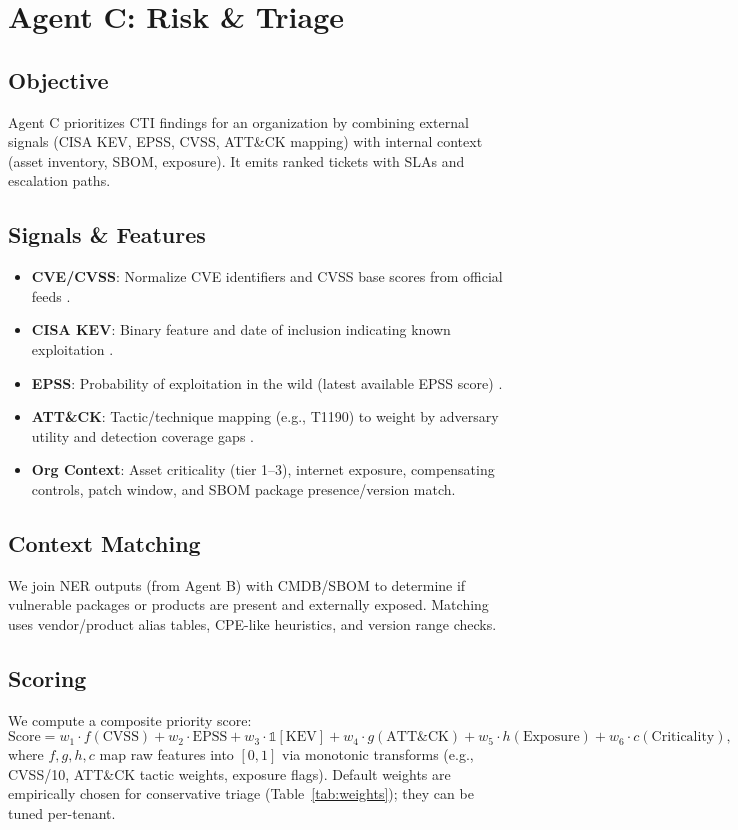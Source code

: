 \section{Agent C: Risk \& Triage}
\label{sec:agentC}

\subsection{Objective}
Agent C prioritizes CTI findings for an organization by combining external signals (CISA KEV, EPSS, CVSS, ATT\&CK mapping) with internal context (asset inventory, SBOM, exposure). It emits ranked tickets with SLAs and escalation paths.

\subsection{Signals \& Features}
\begin{itemize}
  \item \textbf{CVE/CVSS}: Normalize CVE identifiers and CVSS base scores from official feeds \cite{cve_reference}.
  \item \textbf{CISA KEV}: Binary feature and date of inclusion indicating known exploitation \cite{cisa_kev}.
  \item \textbf{EPSS}: Probability of exploitation in the wild (latest available EPSS score) \cite{epss_reference}.
  \item \textbf{ATT\&CK}: Tactic/technique mapping (e.g., T1190) to weight by adversary utility and detection coverage gaps \cite{mitre_attack}.
  \item \textbf{Org Context}: Asset criticality (tier 1--3), internet exposure, compensating controls, patch window, and SBOM package presence/version match.
\end{itemize}

\subsection{Context Matching}
We join NER outputs (from Agent B) with CMDB/SBOM to determine if vulnerable packages or products are present and externally exposed. Matching uses vendor/product alias tables, CPE-like heuristics, and version range checks.

\subsection{Scoring}
We compute a composite priority score:
\[
\text{Score} = w_1 \cdot f(\text{CVSS}) + w_2 \cdot \text{EPSS} + w_3 \cdot \mathbb{1}[\text{KEV}] + 
w_4 \cdot g(\text{ATT\&CK}) + w_5 \cdot h(\text{Exposure}) + w_6 \cdot c(\text{Criticality}),
\]
where $f,g,h,c$ map raw features into $[0,1]$ via monotonic transforms (e.g., CVSS/10, ATT\&CK tactic weights, exposure flags). Default weights are empirically chosen for conservative triage (Table~\ref{tab:weights}); they can be tuned per-tenant.

